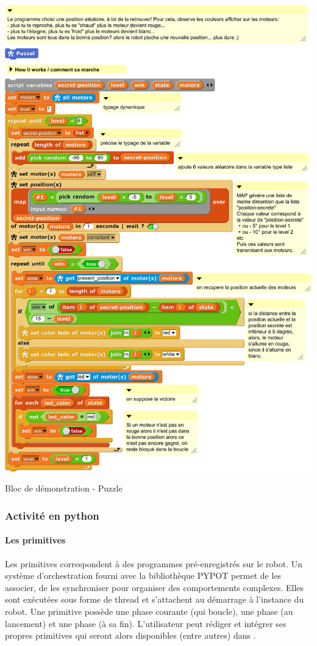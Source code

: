         \begin{code}
            \includegraphics[width=0.85\linewidth]{Figures/prog-puzzle.png}
            \caption{Bloc de démonstration - Puzzle}\label{cod:prog_puzzle}
        \end{code}\par%
        \subsubsection{Activité en python}
            \paragraph{Les primitives}\label{sec:primitives}
                Les primitives correspondent à des programmes pré-enregistrés sur le robot. Un système d'orchestration fourni avec la bibliothèque PYPOT permet de les associer, de les synchroniser pour organiser des comportements complexes. Elles sont exécutées sous forme de thread et s'attachent au démarrage à l'instance du robot.
                Une primitive possède une phase courante (qui boucle), une phase   (au lancement) et une phase   (à sa fin). L’utilisateur peut rédiger et intégrer ses propres primitives qui seront alors disponibles (entre autres) dans  .
